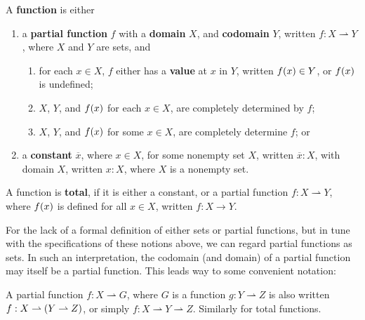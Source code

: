 \begin{specification} A \textbf{function} is either

\begin{enumerate}

\item a \textbf{partial function} $f$ with a \textbf{domain} $X$, and
\textbf{codomain} $Y$, written $f:X\rightharpoonup Y$, where $X$ and $Y$ are
sets, and

\begin{enumerate}

\item for each $x\in X$, $f$ either has a \textbf{value} at $x$ in $Y$, written
$f\mathopen{}\left({x}\right)\mathclose{}\in Y$, or $f\mathopen{}\left({x}\right)\mathclose{}$ is undefined;

\item $X$, $Y$, and $f\mathopen{}\left({x}\right)\mathclose{}$ for each $x\in X$, are completely determined by $f$;

\item $X$, $Y$, and $f\mathopen{}\left({x}\right)\mathclose{}$ for some $x\in X$, are completely determine $f$; or

\end{enumerate}

\item a \textbf{constant} $\overline{x}$, where $x\in X$, for some nonempty set
$X$, written $\overline{x}:X$, with domain $X$, written $x:X$, where $X$ is a
nonempty set.

\end{enumerate}

\end{specification}

\begin{definition} A function is \textbf{total}, if it is either a constant, or
a partial function $f:X\rightharpoonup Y$, where $f\mathopen{}\left({x}\right)\mathclose{}$ is defined for all
$x\in X$, written $f:X\rightarrow Y$.\end{definition}

For the lack of a formal definition of either sets or partial functions, but in
tune with the specifications of these notions above, we can regard partial
functions as sets. In such an interpretation, the codomain (and domain) of a
partial function may itself be a partial function. This leads way to some
convenient notation:

\begin{notation} A partial function $f:X\rightharpoonup G$, where $G$ is a
function $g:Y\rightharpoonup Z$ is also written $f:X\rightharpoonup
\mathopen{}\left({Y\rightharpoonup Z}\right)\mathclose{}$, or simply $f:X\rightharpoonup Y\rightharpoonup Z$.
Similarly for total functions.  \end{notation}

